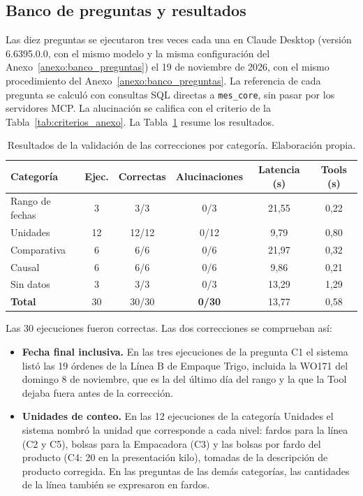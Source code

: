 \begin{singlespace}
\subsection*{Banco de preguntas y resultados}

Las diez preguntas se ejecutaron tres veces cada una en Claude Desktop (versión 6.6395.0.0, con el mismo modelo y la misma configuración del Anexo~\ref{anexo:banco_preguntas}) el 19 de noviembre de 2026, con el mismo procedimiento del Anexo~\ref{anexo:banco_preguntas}. La referencia de cada pregunta se calculó con consultas SQL directas a \texttt{mes\_core}, sin pasar por los servidores MCP. La alucinación se califica con el criterio de la Tabla~\ref{tab:criterios_anexo}. La Tabla~\ref{tab:anexoc_resultados} resume los resultados.

\begin{table}[H]
\centering
\caption{Resultados de la validación de las correcciones por categoría. Elaboración propia.}
\label{tab:anexoc_resultados}
\small
\renewcommand{\arraystretch}{1.3}
\begin{tabular}{lccccc}
\hline
\textbf{Categoría} & \textbf{Ejec.} & \textbf{Correctas} & \textbf{Alucinaciones} & \textbf{Latencia (s)} & \textbf{Tools (s)} \\
\hline
Rango de fechas & 3 & 3/3 & 0/3 & 21,55 & 0,22 \\
Unidades & 12 & 12/12 & 0/12 & 9,79 & 0,80 \\
Comparativa & 6 & 6/6 & 0/6 & 21,97 & 0,32 \\
Causal & 6 & 6/6 & 0/6 & 9,86 & 0,21 \\
Sin datos & 3 & 3/3 & 0/3 & 13,29 & 1,29 \\
\hline
\textbf{Total} & 30 & 30/30 & \textbf{0/30} & 13,77 & 0,58 \\
\hline
\end{tabular}
\end{table}

Las 30 ejecuciones fueron correctas. Las dos correcciones se comprueban así:

\begin{itemize}
\item \textbf{Fecha final inclusiva.} En las tres ejecuciones de la pregunta C1 el sistema listó las 19 órdenes de la Línea B de Empaque Trigo, incluida la WO171 del domingo 8 de noviembre, que es la del último día del rango y la que la Tool dejaba fuera antes de la corrección.
\item \textbf{Unidades de conteo.} En las 12 ejecuciones de la categoría Unidades el sistema nombró la unidad que corresponde a cada nivel: fardos para la línea (C2 y C5), bolsas para la Empacadora (C3) y las bolsas por fardo del producto (C4: 20 en la presentación kilo), tomadas de la descripción de producto corregida. En las preguntas de las demás categorías, las cantidades de la línea también se expresaron en fardos.
\end{itemize}


\end{singlespace}
